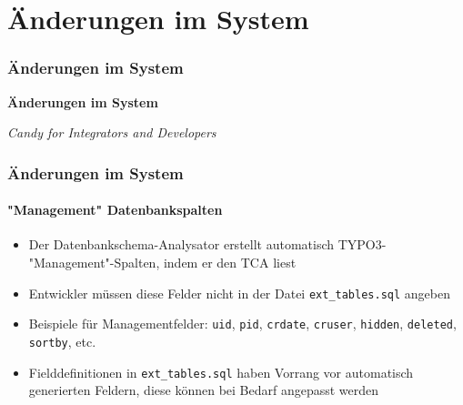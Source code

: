 %

\section{Änderungen im System}
\begin{frame}[fragile]
	\frametitle{Änderungen im System}

	\begin{center}\huge{\color{typo3darkgrey}\textbf{Änderungen im System}}\end{center}
	\begin{center}\large{\textit{Candy for Integrators and Developers}}\end{center}

\end{frame}



\begin{frame}[fragile]
	\frametitle{Änderungen im System}
	\framesubtitle{"Management" Datenbankspalten}

	\begin{itemize}
		\item Der Datenbankschema-Analysator erstellt automatisch TYPO3- "Management"-Spalten,
			indem er den TCA liest
		\item Entwickler müssen diese Felder nicht in der Datei
			\texttt{ext\_tables.sql} angeben
		\item Beispiele für Managementfelder:\newline
			\texttt{uid}, \texttt{pid}, \texttt{crdate}, \texttt{cruser},
			\texttt{hidden}, \texttt{deleted}, \texttt{sortby}, etc.\newline
		\item Fielddefinitionen in \texttt{ext\_tables.sql} haben Vorrang
			vor automatisch generierten Feldern, diese können 
			bei Bedarf angepasst werden
	\end{itemize}

\end{frame}

